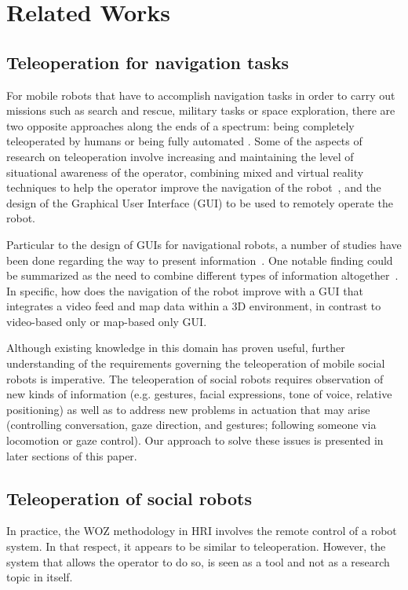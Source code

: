 \documentclass[journal]{IEEEtran}
\begin{document}
\section{Related Works}
\subsection{Teleoperation for navigation tasks}
For mobile robots that have to accomplish navigation tasks in order to carry out missions such as search and rescue, military tasks or space exploration, there are two opposite approaches along the ends of a spectrum: being completely teleoperated by humans \cite{burke:moonlight, wells:talon, yamauchi:packbot} or being fully automated \cite{buehler:darpa}.
Some of the aspects of research on teleoperation involve increasing and maintaining the level of situational awareness of the operator\cite{drury:decomposition, drury:awareness}, combining mixed and virtual reality techniques to help the operator improve the navigation of the robot~\cite{carff:human}, and the design of the Graphical User Interface (GUI) to be used to remotely operate the robot.

Particular to the design of GUIs for navigational robots, a number of studies have been done regarding the way to present information~\cite{meier:sensorfusion, nielsen:comparing}.
One notable finding could be summarized as the need to combine different types of information altogether~\cite{drury:lassoing, nielsen:ecological}.
In specific, how does the navigation of the robot improve with a GUI that integrates a video feed and map data within a 3D environment, in contrast to video-based only or map-based only GUI.

Although existing knowledge in this domain has proven useful, further understanding of the requirements governing the teleoperation of mobile social robots is imperative.
The teleoperation of social robots requires observation of new kinds of information (e.g. gestures, facial expressions, tone of voice, relative positioning) as well as to address new problems in actuation that may arise (controlling conversation, gaze direction, and gestures; following someone via locomotion or gaze control).
Our approach to solve these issues is presented in later sections of this paper.

\subsection{Teleoperation of social robots}
In practice, the WOZ methodology in HRI involves the remote control of a robot system.
In that respect, it appears to be similar to teleoperation.
However, the system that allows the operator to do so, is seen as a tool and not as a research topic in itself.
\end{document}
